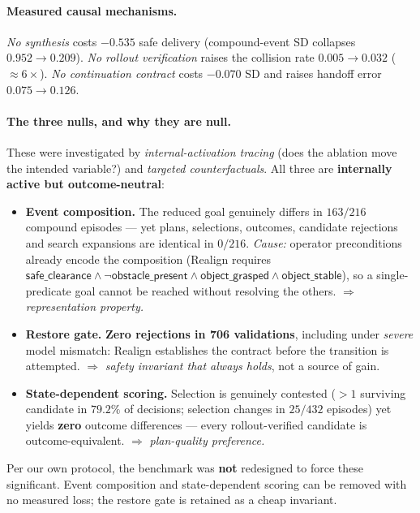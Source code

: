 \documentclass[11pt]{article}
\begin{document}
\paragraph{Measured causal mechanisms.}
\emph{No synthesis} costs $-0.535$ safe delivery (compound-event SD collapses
$0.952\!\to\!0.209$). \emph{No rollout verification} raises the collision rate
$0.005\!\to\!0.032$ ($\approx6\times$). \emph{No continuation contract} costs
$-0.070$ SD and raises handoff error $0.075\!\to\!0.126$.

\paragraph{The three nulls, and why they are null.}
These were investigated by \emph{internal-activation tracing} (does the ablation
move the intended variable?) and \emph{targeted counterfactuals}. All three are
\textbf{internally active but outcome-neutral}:

\begin{itemize}[leftmargin=2em,itemsep=2pt]
\item \textbf{Event composition.} The reduced goal genuinely differs in
      $163/216$ compound episodes --- yet plans, selections, outcomes, candidate
      rejections and search expansions are identical in $0/216$. \emph{Cause:}
      operator preconditions already encode the composition
      (\textsf{Realign} requires
      $\textsf{safe\_clearance}\wedge\neg\textsf{obstacle\_present}\wedge
      \textsf{object\_grasped}\wedge\textsf{object\_stable}$), so a
      single-predicate goal cannot be reached without resolving the others.
      $\Rightarrow$ \emph{representation property.}
\item \textbf{Restore gate.} \textbf{Zero rejections in 706 validations},
      including under \emph{severe} model mismatch: \textsf{Realign} establishes
      the contract before the transition is attempted. $\Rightarrow$
      \emph{safety invariant that always holds}, not a source of gain.
\item \textbf{State-dependent scoring.} Selection is genuinely contested
      ($>1$ surviving candidate in $79.2\%$ of decisions; selection changes in
      $25/432$ episodes) yet yields \textbf{zero} outcome differences --- every
      rollout-verified candidate is outcome-equivalent. $\Rightarrow$
      \emph{plan-quality preference.}
\end{itemize}

Per our own protocol, the benchmark was \textbf{not} redesigned to force these
significant. Event composition and state-dependent scoring can be removed with
no measured loss; the restore gate is retained as a cheap invariant.
\end{document}
